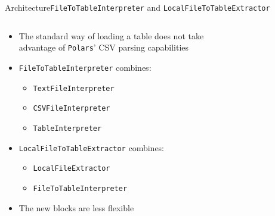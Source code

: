 \begin{frame}[t]{Architecture}{\Verb|FileToTableInterpreter| and \Verb|LocalFileToTableExtractor|}
	\begin{columns}[T]
		\begin{column}{0.5\linewidth}
			\begin{itemize}
				\item The standard way of loading a table does not take advantage of \Verb|Polars|' CSV parsing capabilities
				\item<2-> \Verb|FileToTableInterpreter| combines:
				      \begin{itemize}
					      \item \Verb|TextFileInterpreter|
					      \item \Verb|CSVFileInterpreter|
					      \item \Verb|TableInterpreter|
				      \end{itemize}
				\item<3-> \Verb|LocalFileToTableExtractor| combines:
				      \begin{itemize}
					      \item \Verb|LocalFileExtractor|
					      \item \Verb|FileToTableInterpreter|
				      \end{itemize}
				\item<4-> The new blocks are less flexible
			\end{itemize}
		\end{column}
		\hfill
		\begin{column}{0.5\linewidth}
			\begin{figure}
				\begin{subfigure}{0.3\linewidth}
					
				\end{subfigure}
				\hfill
				\hfill
			\end{figure}
		\end{column}
	\end{columns}
\end{frame}
